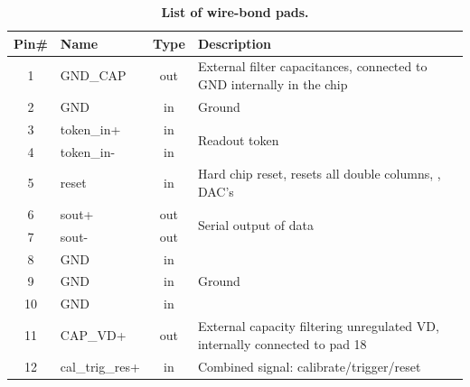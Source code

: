 \begin{table}[h]
    \begin{center}
	\caption{\textbf{List of wire-bond pads.} }
	\label{tab:ROCpinout}

	\bigskip

	{\scriptsize
	\begin{tabular}{clcl}
	\toprule %
	Pin\# & Name         & Type & Description \\
	\midrule %
	 1 & GND\_CAP        & out & External filter capacitances, connected to GND internally in the chip \\
	\midrule %
	 2 & GND             & in  & Ground \\
	\midrule %
	 3 & token\_in+      & in  & \multirow{2}{*}{Readout token} \\
	 4 & token\_in-      & in  & \\
	\midrule %
	 5 & reset           & in  & Hard chip reset, resets all double columns, \isqc{}, DAC's \\
	\midrule %
	 6 & sout+           & out & \multirow{2}{*}{Serial output of data} \\
	 7 & sout-           & out & \\
	\midrule %
	 8 & GND             & in  & \multirow{3}{*}{Ground}  \\
	 9 & GND             & in  & \\
	10 & GND             & in  & \\
	\midrule %
	11 & CAP\_VD+        & out & External capacity filtering unregulated VD, internally connected to pad 18 \\
	\midrule %
	12 & cal\_trig\_res+ & in  & \multirow{2}{*}{Combined signal: calibrate/trigger/reset} \\

\end{tabular}}
\end{center}
\end{table}
